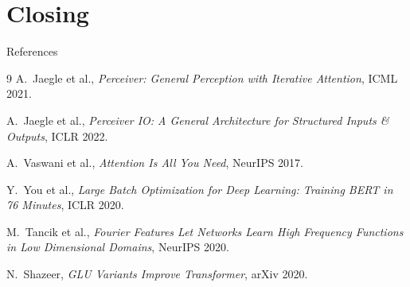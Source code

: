 \documentclass[aspectratio=169,11pt]{beamer}
\begin{document}
\section{Closing}

\begin{frame}{References}
  \small
  \begin{thebibliography}{9}
     A.~Jaegle et al.,
    \textit{Perceiver: General Perception with Iterative Attention},
    ICML 2021.

     A.~Jaegle et al.,
    \textit{Perceiver IO: A General Architecture for Structured Inputs \& Outputs},
    ICLR 2022.

     A.~Vaswani et al.,
    \textit{Attention Is All You Need},
    NeurIPS 2017.

     Y.~You et al.,
    \textit{Large Batch Optimization for Deep Learning: Training BERT in 76 Minutes},
    ICLR 2020.

     M.~Tancik et al.,
    \textit{Fourier Features Let Networks Learn High Frequency Functions in Low Dimensional Domains},
    NeurIPS 2020.

     N.~Shazeer,
    \textit{GLU Variants Improve Transformer},
    arXiv 2020.
  \end{thebibliography}
\end{frame}
\end{document}
